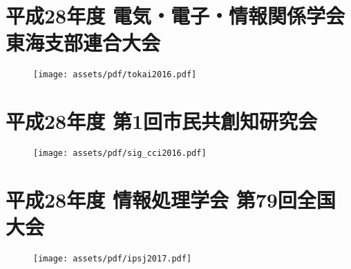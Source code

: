 \cleardoublepage
\chapter{平成28年度 電気・電子・情報関係学会 東海支部連合大会}
\begin{figure}[ht]
    \begin{center}
        \texttt{[image: assets/pdf/tokai2016.pdf]}
    \end{center}
\end{figure}
\clearpage

\cleardoublepage
\chapter{平成28年度 第1回市民共創知研究会}
\begin{figure}[ht]
    \begin{center}
        \texttt{[image: assets/pdf/sig\_cci2016.pdf]}
    \end{center}
\end{figure}
\clearpage

\cleardoublepage
\chapter{平成28年度 情報処理学会 第79回全国大会}
\begin{figure}[ht]
    \begin{center}
        \texttt{[image: assets/pdf/ipsj2017.pdf]}
    \end{center}
\end{figure}
\clearpage
